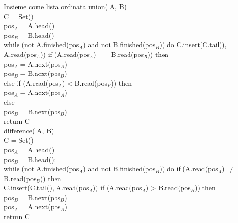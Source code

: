 \begin{minicode}{Insieme come lista ordinata}
\ind{} union( A,  B)\\
     C = Set()\\
     pos$_A$ = A.head()\\
     pos$_B$ = B.head()\\
    \indf while (not A.finished(pos$_A$) and not B.finished(pos$_B$)) do\hfill{}
        C.insert(C.tail(), A.read(pos$_A$))\hfill{}
        \indff if (A.read(pos$_A$) == B.read(pos$_B$)) then\\    
            pos$_A$ = A.next(pos$_A$)\\
            pos$_B$ = B.next(pos$_B$)\\
        \indff else if (A.read(pos$_A$) < B.read(pos$_B$)) then\\
            pos$_A$ = A.next(pos$_A$)\\
        \indff else\\
            pos$_B$ = B.next(pos$_B$)\\
    \indf return C\\

\ind{} difference( A,  B)\\
     C = Set()\\
     pos$_A$ = A.head();\\
     pos$_B$ = B.head();\\
    \indf while (not A.finished(pos$_A$) and not B.finished(pos$_B$)) do\hfill{}
        \indff if  (A.read(pos$_A$) $\neq$ B.read(pos$_B$)) then\\
            C.insert(C.tail(), A.read(pos$_A$))\hfill{}
            \indfff if (A.read(pos$_A$) > B.read(pos$_B$)) then\\
                pos$_B$ = B.next(pos$_B$)\\
            \indfff pos$_A$ = A.next(pos$_A$)\\
    \indf return C\\
\end{minicode}
\newpage
